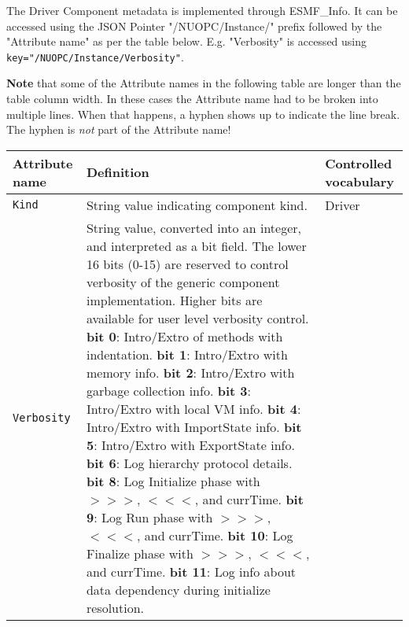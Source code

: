 \label{DriverCompMeta}
The Driver Component metadata is implemented through ESMF\_Info. It can be accessed
using the JSON Pointer "/NUOPC/Instance/" prefix followed by the "Attribute name"
as per the table below. E.g. "Verbosity" is accessed using {\tt key="/NUOPC/Instance/Verbosity"}.

{\bf Note} that some of the Attribute names in the following table are longer than the table column width. In these cases the
Attribute name had to be broken into multiple lines. When that happens, a hyphen shows up to indicate the line break. The hyphen
is {\em not} part of the Attribute name!

\begin{longtable}{|p{}|p{}|p{}|}
     \hline\hline
     {\bf Attribute name} & {\bf Definition} & {\bf Controlled vocabulary}\\
     \hline\hline
     {\tt Kind} & String value indicating component kind.& Driver\\ \hline
     {\tt Verbosity} & String value, converted into an integer, and interpreted as a bit field. The lower 16 bits (0-15) are reserved to control verbosity of the generic component implementation. Higher bits are available for user level verbosity control. \newline
                       {\bf bit 0}: Intro/Extro of methods with indentation.\newline
                       {\bf bit 1}: Intro/Extro with memory info.\newline
                       {\bf bit 2}: Intro/Extro with garbage collection info.\newline
                       {\bf bit 3}: Intro/Extro with local VM info.\newline
                       {\bf bit 4}: Intro/Extro with ImportState info.\newline
                       {\bf bit 5}: Intro/Extro with ExportState info.\newline
                       {\bf bit 6}: Log hierarchy protocol details.\newline
                       {\bf bit 8}: Log Initialize phase with $>>>$, $<<<$, and currTime.\newline
                       {\bf bit 9}: Log Run phase with $>>>$, $<<<$, and currTime.\newline
                       {\bf bit 10}: Log Finalize phase with $>>>$, $<<<$, and currTime.\newline
                       {\bf bit 11}: Log info about data dependency during initialize resolution.\newline

\end{longtable}
